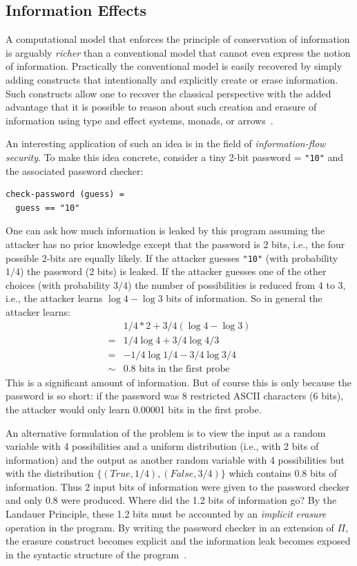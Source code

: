 \documentclass{article}
\begin{document}
\subsection{Information Effects}

A computational model that enforces the principle of conservation of
information is arguably \emph{richer} than a conventional model that
cannot even express the notion of information. Practically the
conventional model is easily recovered by simply adding constructs
that intentionally and explicitly create or erase information. Such
constructs allow one to recover the classical perspective with the
added advantage that it is possible to reason about such creation and
erasure of information using type and effect systems, monads, or
arrows~\cite{infeffects,inversearrows}.

An interesting application of such an idea is in the field of
\emph{information-flow security}. To make this idea concrete, consider
a tiny 2-bit password = \verb|"10"| and the associated password checker:

\begin{verbatim}
check-password (guess) =
  guess == "10"
\end{verbatim}

One can ask how much information is leaked by this program assuming
the attacker has no prior knowledge except that the password is 2
bits, i.e., the four possible 2-bits are equally likely. If the
attacker guesses \verb|"10"| (with probability $1/4$) the password (2
bits) is leaked. If the attacker guesses one of the other choices
(with probability $3/4$) the number of possibilities is reduced from 4
to 3, i.e., the attacker learns $\log{4} - \log{3}$ bits of
information. So in general the attacker learns:
\[\begin{array}{ll}
   &  1/4 * 2 + 3/4 (\log{4} - \log{3}) \\
  =&  1/4 \log{4} + 3/4 \log{4/3} \\
  =&  - 1/4 \log{1/4} - 3/4 \log{3/4} \\
  \sim& 0.8 \mbox{~bits~in~the~first~probe}
\end{array}\]
This is a significant amount of information. But of course this is
only because the password is so short: if the password was 8
restricted ASCII characters (6 bits), the attacker would only learn
0.00001 bits in the first probe.

An alternative formulation of the problem is to view the input as a
random variable with 4 possibilities and a uniform distribution (i.e.,
with 2 bits of information) and the output as another random variable
with 4 possibilities but with the distribution
$\{ (\mathit{True}, 1/4), (\mathit{False}, 3/4) \}$ which contains 0.8 bits of
information. Thus 2 input bits of information were given to the
password checker and only 0.8 were produced. Where did the 1.2 bits of
information go? By the Landauer Principle, these 1.2 bits must be
accounted by an \emph{implicit} \emph{erasure} operation in the
program. By writing the password checker in an extension of $\Pi$, the
erasure construct becomes explicit and the information leak becomes
exposed in the syntactic structure of the program~\cite{infeffects}.
\end{document}
